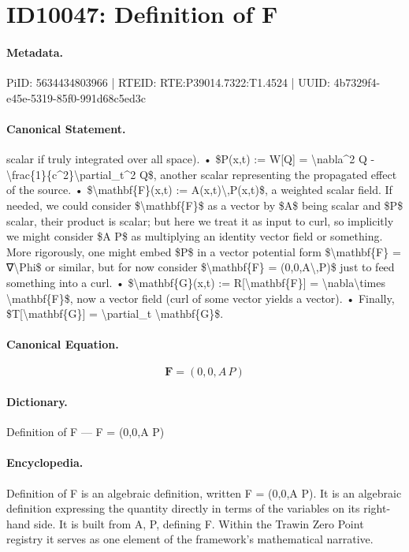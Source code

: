 \section*{ID10047: Definition of F}
\paragraph{Metadata.}
PiID: 5634434803966 | RTEID: RTE:P39014.7322:T1.4524 | UUID: 4b7329f4-e45e-5319-85f0-991d68c5ed3c

\paragraph{Canonical Statement.}
scalar if truly integrated over all space). • \$P(x,t) := W[Q] = \textbackslash{}nabla\textasciicircum{}2 Q - \textbackslash{}frac\{1\}\{c\textasciicircum{}2\}\textbackslash{}partial\_t\textasciicircum{}2 Q\$, another scalar representing the propagated effect of the source. • \$\textbackslash{}mathbf\{F\}(x,t) := A(x,t)\textbackslash{},P(x,t)\$, a weighted scalar field. If needed, we could consider \$\textbackslash{}mathbf\{F\}\$ as a vector by \$A\$ being scalar and \$P\$ scalar, their product is scalar; but here we treat it as input to curl, so implicitly we might consider \$A P\$ as multiplying an identity vector field or something. More rigorously, one might embed \$P\$ in a vector potential form \$\textbackslash{}mathbf\{F\} = ∇\textbackslash{}Phi\$ or similar, but for now consider \$\textbackslash{}mathbf\{F\} = (0,0,A\textbackslash{},P)\$ just to feed something into a curl. • \$\textbackslash{}mathbf\{G\}(x,t) := R[\textbackslash{}mathbf\{F\}] = \textbackslash{}nabla\textbackslash{}times \textbackslash{}mathbf\{F\}\$, now a vector field (curl of some vector yields a vector). • Finally, \$T[\textbackslash{}mathbf\{G\}] = \textbackslash{}partial\_t \textbackslash{}mathbf\{G\}\$.

\paragraph{Canonical Equation.}
\[
\mathbf{F} = (0,0,A\,P)
\]

\paragraph{Dictionary.}
Definition of F — F = (0,0,A P)

\paragraph{Encyclopedia.}
Definition of F is an algebraic definition, written F = (0,0,A P). It is an algebraic definition expressing the quantity directly in terms of the variables on its right-hand side. It is built from A, P, defining F. Within the Trawin Zero Point registry it serves as one element of the framework's mathematical narrative.
